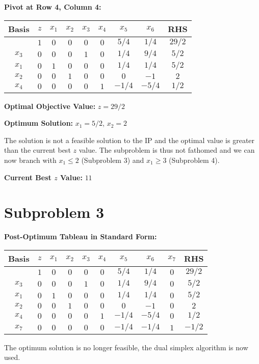 \documentclass{article}[12pt,a4paper]
\begin{document}
\begin{enumerate}
  	   \noindent \textbf{Pivot at Row 4, Column 4:}
  	  \begin{center}
 	   \begin{tabular}{c | c | c c c c c c | c}
            		Basis & $z$ & $x_1$ & $x_2$ & $x_3$ & $x_4$ & $x_5$ & $x_6$ & RHS \\ \hline
  			           & $1$ & $0$ & $0$   & $0$ & $0$     & $5/4$ & $1/4$ & $29/2$  \\ \hline
  			$x_3$ & $0$ & $0$ & $0$   & $1$    & $0$  & $1/4$ & $9/4$ & $5/2$ \\
  			$x_1$ & $0$ & $1$ & $0$  &  $0$    & $0$  & $1/4$ & $1/4$ & $5/2$ \\
  			$x_2$ & $0$ & $0$ & $1$ &   $0$    & $0$ & $0$ & $-1$ & $2$ \\
  			$x_4$ & $0$ & $0$ & $0$ &   $0$    & $1$ & $-1/4$ & $-5/4$ & $1/2$ \\
  	  \end{tabular}
  	  \end{center}
  	  
  	   \textbf{Optimal Objective Value:} $z = 29/2$
  	  
  	  \noindent \textbf{Optimum Solution:} $x_1 = 5/2$, $x_2 = 2$
  	  
  	  \noindent The solution is not a feasible solution to the IP and the optimal value is greater than the current best $z$ value.
  	  The subproblem is thus not fathomed and we can now branch with 
  	  $x_1 \le 2$ (Subproblem 3) and $x_1 \ge 3$ (Subproblem 4).
  	  
  	  \noindent \textbf{Current Best $z$ Value:} $11$
  	  
  	   \noindent \section*{Subproblem 3}
  	  \textbf{Post-Optimum Tableau in Standard Form:}
  	  \begin{center}
 	   \begin{tabular}{c | c | c c c c c c c | c}
            		Basis & $z$ & $x_1$ & $x_2$ & $x_3$ & $x_4$ & $x_5$ & $x_6$ & $x_7$ & RHS \\ \hline
  			           & $1$ & $0$ & $0$   & $0$ & $0$     & $5/4$ & $1/4$ & $0$ & $29/2$  \\ \hline
  			$x_3$ & $0$ & $0$ & $0$ & $1$   & $0$    & $1/4$  & $9/4$ & $0$ & $5/2$ \\
  			$x_1$ & $0$ & $1$ & $0$  &  $0$    & $0$  & $1/4$ & $1/4$ & $0$ & $5/2$ \\
  			$x_2$ & $0$ & $0$ & $1$ &   $0$    & $0$ & $0$ & $-1$ & $0$ & $2$ \\
  			$x_4$ & $0$ & $0$ & $0$ &   $0$    & $1$ & $-1/4$ & $-5/4$ & $0$ & $1/2$ \\
  			$x_7$ & $0$ & $0$ & $0$ &   $0$    & $0$ & $-1/4$ & $-1/4$ & $1$ & $-1/2$ \\
  	  \end{tabular}
  	  \end{center}
  	  The optimum solution is no longer feasible, the dual simplex algorithm is now used. 
  	  

\end{enumerate}
\end{document}
